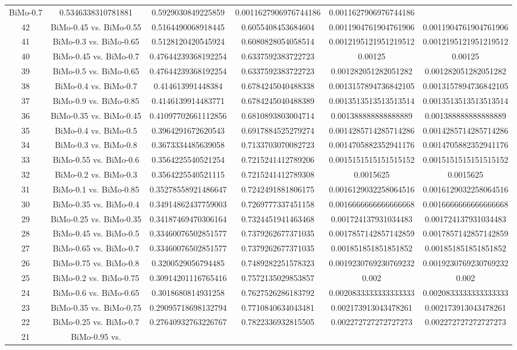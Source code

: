 \documentclass[a4paper,10pt]{article}
\begin{document}
\begin{landscape}
\begin{table}[!htp]
\begin{tabular}{cccccc}
BiMo-0.7&0.5346338310781881&0.5929030849225859&0.0011627906976744186&0.0011627906976744186\\42&BiMo-0.45 vs. BiMo-0.55&0.5164490068918445&0.6055408453684604&0.0011904761904761906&0.0011904761904761906\\41&BiMo-0.3 vs. BiMo-0.65&0.5128120420545924&0.6080828054058514&0.0012195121951219512&0.0012195121951219512\\40&BiMo-0.45 vs. BiMo-0.7&0.47644239368192254&0.6337592383722723&0.00125&0.00125\\39&BiMo-0.5 vs. BiMo-0.65&0.47644239368192254&0.6337592383722723&0.001282051282051282&0.001282051282051282\\38&BiMo-0.4 vs. BiMo-0.7&0.414613991448384&0.6784245040488338&0.0013157894736842105&0.0013157894736842105\\37&BiMo-0.9 vs. BiMo-0.85&0.4146139914483771&0.6784245040488389&0.0013513513513513514&0.0013513513513513514\\36&BiMo-0.35 vs. BiMo-0.45&0.41097702661112856&0.6810893803004714&0.001388888888888889&0.001388888888888889\\35&BiMo-0.4 vs. BiMo-0.5&0.3964291672620543&0.6917884525279274&0.0014285714285714286&0.0014285714285714286\\34&BiMo-0.3 vs. BiMo-0.8&0.3673334485639058&0.7133703070082723&0.0014705882352941176&0.0014705882352941176\\33&BiMo-0.55 vs. BiMo-0.6&0.3564225540521254&0.7215241412789206&0.0015151515151515152&0.0015151515151515152\\32&BiMo-0.2 vs. BiMo-0.3&0.3564225540521115&0.7215241412789308&0.0015625&0.0015625\\31&BiMo-0.1 vs. BiMo-0.85&0.35278558921486647&0.7242491881806175&0.0016129032258064516&0.0016129032258064516\\30&BiMo-0.35 vs. BiMo-0.4&0.34914862437759003&0.7269777337451158&0.0016666666666666668&0.0016666666666666668\\29&BiMo-0.25 vs. BiMo-0.35&0.34187469470306164&0.7324451941463468&0.001724137931034483&0.001724137931034483\\28&BiMo-0.45 vs. BiMo-0.5&0.33460076502851577&0.7379262677371035&0.0017857142857142859&0.0017857142857142859\\27&BiMo-0.65 vs. BiMo-0.7&0.33460076502851577&0.7379262677371035&0.001851851851851852&0.001851851851851852\\26&BiMo-0.75 vs. BiMo-0.8&0.3200529056794485&0.7489282251578323&0.0019230769230769232&0.0019230769230769232\\25&BiMo-0.2 vs. BiMo-0.75&0.30914201116765416&0.7572135029853857&0.002&0.002\\24&BiMo-0.6 vs. BiMo-0.65&0.3018680814931258&0.7627526286183792&0.0020833333333333333&0.0020833333333333333\\23&BiMo-0.35 vs. BiMo-0.75&0.29095718698132794&0.7710840634043481&0.002173913043478261&0.002173913043478261\\22&BiMo-0.25 vs. BiMo-0.7&0.27640932763226767&0.7822336932815505&0.002272727272727273&0.002272727272727273\\21&BiMo-0.95 vs. 
\end{tabular}
\end{table}
\end{landscape}
\end{document}
